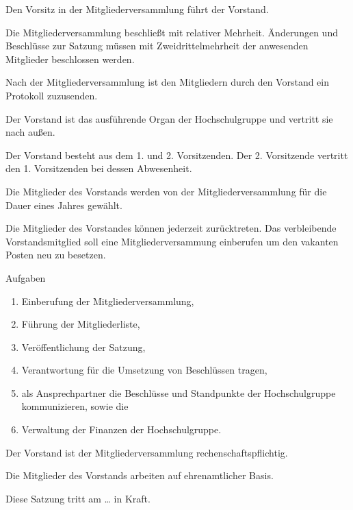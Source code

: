 \documentclass[a4paper, parskip=half, numbers=noenddot]{scrartcl}
\begin{document}
\begin{contract}
Den Vorsitz in der Mitgliederversammlung führt der Vorstand.

Die Mitgliederversammlung beschließt mit relativer Mehrheit. Änderungen und Beschlüsse zur Satzung müssen mit Zweidrittelmehrheit der anwesenden Mitglieder beschlossen werden.

Nach der Mitgliederversammlung ist den Mitgliedern durch den Vorstand ein Protokoll zuzusenden.



%
%

%

Der Vorstand ist das ausführende Organ der Hochschulgruppe und vertritt sie nach außen.

Der Vorstand besteht aus dem 1. und 2. Vorsitzenden. Der 2. Vorsitzende vertritt den 1. Vorsitzenden bei dessen Abwesenheit.

Die Mitglieder des Vorstands werden von der Mitgliederversammlung für die Dauer eines Jahres gewählt.

Die Mitglieder des Vorstandes können jederzeit zurücktreten. Das verbleibende Vorstandsmitglied soll eine Mitgliederversammung einberufen um den vakanten Posten neu zu besetzen.

Aufgaben
\begin{enumerate}
\item Einberufung der Mitgliederversammlung,
\item Führung der Mitgliederliste,
\item Veröffentlichung der Satzung,
\item Verantwortung für die Umsetzung von Beschlüssen tragen,
\item als Ansprechpartner die Beschlüsse und Standpunkte der Hochschulgruppe kommunizieren, sowie die
\item Verwaltung der Finanzen der Hochschulgruppe.
\end{enumerate}

Der Vorstand ist der Mitgliederversammlung rech\-en\-schafts\-pflichtig.

Die Mitglieder des Vorstands arbeiten auf ehrenamtlicher Basis.


%
%


Diese Satzung tritt am \dots{} in Kraft.

\end{contract}
\end{document}
